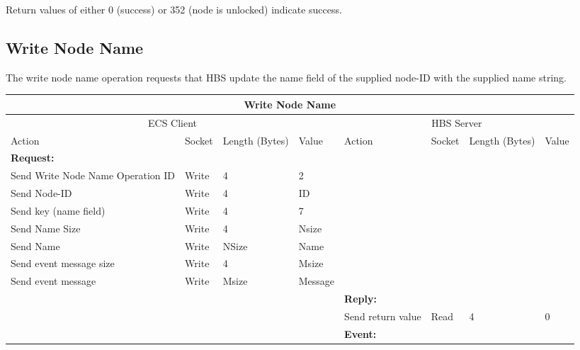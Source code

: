 Return values of either 0 (success) or 352  (node is unlocked) 
indicate success.




\newpage
\subsection{Write Node Name}

The write node name operation requests that HBS update the name field of
the supplied node-ID with the supplied name string.



\bigskip
\small
\begin{tabular}{|p{1.2in}|p{.4in}|p{.4in}|p{.5in}|p{1.2in}|p{.4in}|p{.4in}|p{.5in} |} \hline
\multicolumn{8}{|c|}{{\bf Write Node Name}} \\ \hline
\multicolumn{4}{|c|}{ECS Client} & \multicolumn{4}{|c|}{HBS Server} \\ \hline
Action            & Socket & Length  
                            (Bytes)& Value & Action       & Socket & Length 
                                                                    (Bytes)& Value \\ \hline
\multicolumn{4}{|l}{{\bf Request:}}&\multicolumn{4}{|l|}{~} \\ \hline
Send Write Node Name Operation ID  & Write  & 4     & 2     &              &        &       &       \\ \hline
Send Node-ID      & Write  & 4     &  ID &           &        &       &       \\ \hline
Send key (name field)    & Write  & 4     & 7   &              &        &       &       \\ \hline
Send Name Size    & Write  & 4     &  Nsize &        &        &       &       \\ \hline
Send Name         & Write  &  NSize &  Name &   &        &       &       \\ \hline
Send event
message size      & Write  & 4     &  Msize &         &        &       &       \\ \hline
Send event message
                  & Write  &  Msize  &  Message &     &        &       &       \\ \hline
\multicolumn{4}{|l}{~}&\multicolumn{4}{|l|}{{\bf Reply:}} \\ \hline
                  &        &       &       & Send return
                                             value        & Read   &  4    & 0       \\ \hline
\multicolumn{4}{|l}{~}&\multicolumn{4}{|l|}{{\bf Event:}} \\ \hline

\end{tabular}
